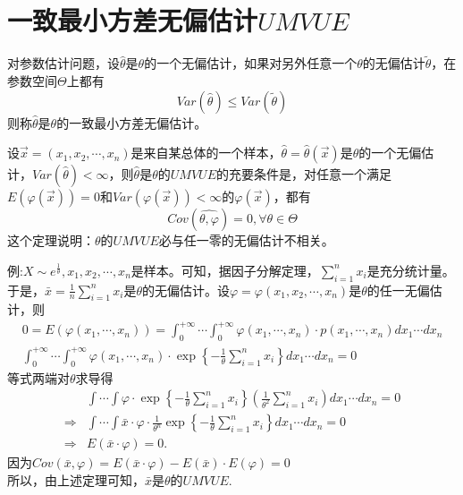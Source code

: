 \section{一致最小方差无偏估计$UMVUE$}
\begin{definition}
对参数估计问题，设$\hat{\theta}$是$\theta$的一个无偏估计，如果对另外任意一个$\theta$的无偏估计$\tilde{\theta}$，在参数空间$\Theta$上都有$$Var(\hat{\theta})\le Var(\tilde{\theta})$$则称$\hat{\theta}$是$\theta$的一致最小方差无偏估计。
\end{definition}
\begin{theorem}[充要条件]
设$\vec{x} =(x_{1},x_{2},\cdots,x_{n})$是来自某总体的一个样本，$\hat{\theta}=\hat{\theta}(\vec{x})$是$\theta$的一个无偏估计，$Var(\hat{\theta})<\infty$，则$\hat{\theta}$是$\theta$的$UMVUE$的充要条件是，对任意一个满足$E(\varphi (\vec{x} ))=0$和$Var(\varphi (\vec{x} ))<\infty$的$\varphi (\vec{x} )$，都有$$Cov(\hat{\theta,\varphi})=0,\forall\theta\in\Theta$$
这个定理说明：$\theta$的$UMVUE$必与任一零的无偏估计不相关。
\end{theorem}
例:$X\sim e^{\frac{1}{\theta}},x_{1},x_{2},\cdots,x_{n}$是样本。可知，据因子分解定理，$\sum_{i=1}^{n}x_{i}  $是充分统计量。于是，$\bar{x}=\frac{1}{n}\sum_{i=1}^{n}x_{i}  $是$\theta$的无偏估计。设$\varphi=\varphi(x_{1},x_{2},\cdots,x_{n})$是$\theta$的任一无偏估计，则
$$\begin{array}{l}
0=E\left(\varphi\left(x_{1}, \cdots, x_{n}\right)\right)=\int_{0}^{+\infty} \cdots \int_{0}^{+\infty} \varphi\left(x_{1}, \cdots, x_{n}\right) \cdot p\left(x_{1}, \cdots, x_{n}\right) d x_{1} \cdots d x_{n} \\
\int_{0}^{+\infty} \cdots \int_{0}^{+\infty} \varphi\left(x_{1}, \cdots, x_{n}\right) \cdot \exp \left\{-\frac{1}{\theta} \sum_{i=1}^{n} x_{i}\right\} d x_{1} \cdots d x_{n}=0 
\end{array}$$
等式两端对$\theta$求导得
$$\begin{aligned}
& \int \cdots \int \varphi \cdot \exp \left\{-\frac{1}{\theta} \sum_{i=1}^{n} x_{i}\right\}\left(\frac{1}{\theta^{2}} \sum_{i=1}^{n} x_{i}\right) d x_{1} \cdots d x_{n}=0 \\
\Rightarrow & \int \cdots \int \bar{x} \cdot \varphi \cdot \frac{1}{\theta^{n}} \exp \left\{-\frac{1}{\theta} \sum_{i=1}^{n} x_{i}\right\} d x_{1} \cdots d x_{n}=0 \\
\Rightarrow & E(\bar{x} \cdot \varphi)=0 .
\end{aligned}$$
因为$Cov(\bar{x},\varphi)=E(\bar{x}\cdot\varphi)-E(\bar{x})\cdot E(\varphi)=0$\\
所以，由上述定理可知，$\bar{x}$是$\theta$的$UMVUE$.


